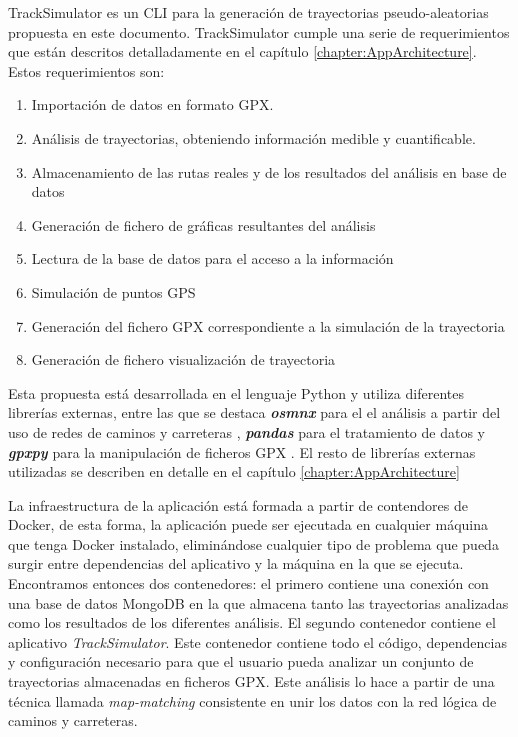 TrackSimulator es un \ac{CLI} para la generación de trayectorias pseudo-aleatorias propuesta en este documento. TrackSimulator cumple una serie de requerimientos que están descritos detalladamente en el capítulo \ref{chapter:AppArchitecture}. Estos requerimientos son:
\begin{enumerate}

\item Importación de datos en formato \ac{GPX}.

\item Análisis de trayectorias, obteniendo información medible y cuantificable.

\item Almacenamiento de las rutas reales y de los resultados del análisis en base de datos

\item Generación de fichero de gráficas resultantes del análisis 

\item Lectura de la base de datos para el acceso a la información

\item Simulación de puntos \ac{GPS}

\item Generación del fichero GPX correspondiente a la simulación de la trayectoria

\item Generación de fichero visualización de trayectoria

\end{enumerate} 

Esta propuesta está desarrollada en el lenguaje Python y utiliza diferentes librerías externas, entre las que se destaca \textbf{\textit{osmnx}} para el el análisis a partir del uso de redes de caminos y carreteras \cite{Boeing01}, \textbf{\textit{pandas}} para el tratamiento de datos \cite{Pandas01} y \textbf{\textit{gpxpy}} para la manipulación de ficheros \ac{GPX} \cite{Gpxpy01}. El resto de librerías externas utilizadas se describen en detalle en el capítulo \ref{chapter:AppArchitecture}

La infraestructura de la aplicación está formada a partir de contendores de Docker, de esta forma, la aplicación puede ser ejecutada en cualquier máquina que tenga Docker instalado, eliminándose cualquier tipo de problema que pueda surgir entre dependencias del aplicativo y la máquina en la que se ejecuta. Encontramos entonces dos contenedores: el primero contiene una conexión con una base de datos MongoDB en la que almacena tanto las trayectorias analizadas como los resultados de los diferentes análisis. El segundo contenedor contiene el aplicativo \textit{TrackSimulator}. Este contenedor contiene todo el código, dependencias y configuración necesario para que el usuario pueda analizar un conjunto de trayectorias almacenadas en ficheros  \ac{GPX}. Este análisis lo hace a partir de una técnica llamada \textit{map-matching} consistente en unir los datos con la red lógica de caminos y carreteras.

